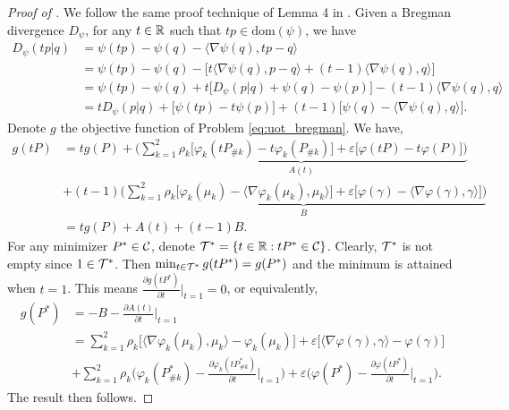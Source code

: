 \begin{proof}[Proof of ]
We follow the same proof technique of Lemma 4 in \citep{Khiem20}.
Given a Bregman divergence $D_{\psi}$, for any $t \in \mathbb R$ such that $tp \in \text{dom}(\psi)$,
we have
\begin{align}
  D_{\psi}(t p | q)
  &= \psi(tp) - \psi(q) - \langle \nabla \psi(q), tp - q \rangle \\
  &= \psi(tp) - \psi(q) - \Big[
    t \langle \nabla \psi(q), p - q \rangle + (t-1) \langle \nabla \psi(q), q \rangle
  \Big] \\
  &= \psi(tp) - \psi(q) + t \Big[ D_{\psi}(p | q) + \psi(q) - \psi(p) \Big]
  - (t-1) \langle \nabla \psi(q), q \rangle \\
  &= t D_{\psi}(p | q) + \big[ \psi(tp) - t \psi(p) \big]
  + (t-1) \big[ \psi(q) - \langle \nabla \psi(q), q \rangle \big].
\end{align}
Denote $g$ the objective function of Problem \eqref{eq:uot_bregman}. We have,
\begin{align}
  g(tP) &= t g(P) +
  \underbrace{\Big( \sum_{k=1}^2 \rho_k \big[ \varphi_k(tP_{\# k}) - t \varphi_k(P_{\# k}) \big]
  + \varepsilon \big[ \varphi(tP) - t \varphi(P) \big] \Big)}_{A(t)} \\
  &+ (t-1) \underbrace{\Big(
    \sum_{k=1}^2 \rho_k \big[ \varphi_k(\mu_k) - \langle \nabla \varphi_k(\mu_k), \mu_k \rangle \big]
    + \varepsilon \big[ \varphi(\gamma) - \langle \nabla \varphi(\gamma), \gamma \rangle \big]
    \Big)}_{B} \\
    &= t g(P) + A(t) + (t-1) B.
\end{align}
For any minimizer $P^* \in \mathcal C$, denote $\mathcal T^* =\{ t \in \mathbb R: tP^* \in \mathcal C \}$. Clearly, $\mathcal T^*$ is
not empty since $1 \in \mathcal T^*$. Then $\min_{t \in \mathcal T^*} g(tP^*) = g(P^*)$ and the minimum is
attained when $t=1$. This means $\frac{\partial g(tP^*)}{\partial t} \Big |_{t = 1} = 0$,
or equivalently,
\begin{align}
  g(P^*) &= - B - \frac{\partial A(t)}{\partial t} \bigg|_{t=1} \\
  &= \sum_{k=1}^2 \rho_k \Big[ \langle \nabla \varphi_k(\mu_k), \mu_k \rangle - \varphi_k(\mu_k) \Big]
  + \varepsilon \Big[ \langle \nabla \varphi(\gamma), \gamma \rangle - \varphi(\gamma) \Big] \\
  &+ \sum_{k=1}^2
  \rho_k \Bigg( \varphi_k(P^*_{\# k}) - \frac{\partial \varphi_k(tP^*_{\# k})}{\partial t} \bigg|_{t=1} \Bigg)
  + \varepsilon \Bigg( \varphi(P^*) - \frac{\partial \varphi(tP^*)}{\partial t} \bigg|_{t=1} \Bigg).
\end{align}
The result then follows.
\end{proof}

